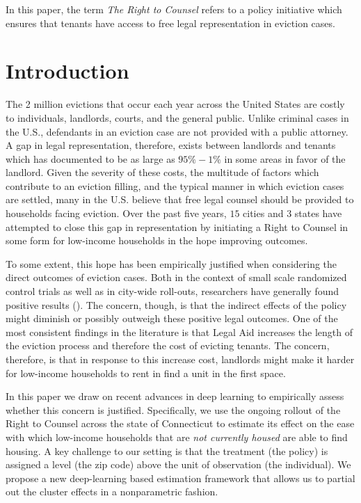 \documentclass[a4paper,12pt]{article}
\begin{document}
In this paper, the term \textit{The Right to Counsel} refers to a policy initiative which ensures that tenants have access to free legal representation in eviction cases. 

\section{Introduction}
The 2 million evictions that occur each year across the United States are costly to individuals, landlords, courts, and the general public. Unlike criminal cases in the U.S., defendants in an eviction case are not provided with a public attorney. A gap in legal representation, therefore, exists between landlords and tenants which \cite{collinson2022eviction} has documented to be as large as $95\%-1\%$ in some areas in favor of the landlord. Given the severity of these costs, the multitude of factors which contribute to an eviction filling, and the typical manner in which eviction cases are settled, many in the U.S. believe that free legal counsel should be provided to households facing eviction.  Over the past five years, $15$ cities and $3$ states have attempted to close this gap in representation by initiating a Right to Counsel in some form for low-income households in the hope improving outcomes. \par 

To some extent, this hope has been empirically justified when considering the direct outcomes of eviction cases. Both in the context of small scale randomized control trials as well as in city-wide roll-outs, researchers have generally found positive results (\cite{seron2001impact, greiner2012limits, cassidy2022effects}). The concern, though, is that the indirect effects of the policy might diminish or possibly outweigh these positive legal outcomes. One of the most consistent findings in the literature is that Legal Aid increases the length of the eviction process and therefore the cost of evicting tenants. The concern, therefore, is that in response to this increase cost, landlords might make it harder for low-income households to rent in find a unit in the first space.\par 
In this paper we draw on recent advances in deep learning to empirically assess whether this concern is justified. Specifically, we use the ongoing rollout of the Right to Counsel across the state of Connecticut to estimate its effect on the ease with which low-income households that are \textit{not currently housed} are able to find housing. A key challenge to our setting is that the treatment (the policy) is assigned a level (the zip code) above the unit of observation (the individual). We propose a new deep-learning based estimation framework that allows us to partial out the cluster effects in a nonparametric fashion.
\end{document}

